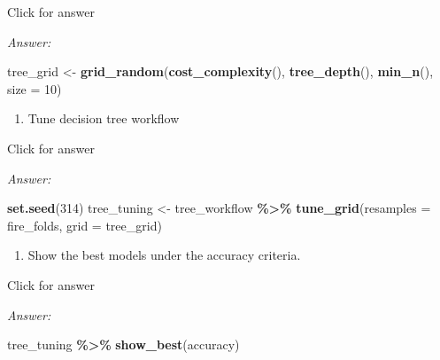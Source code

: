 \documentclass[
]{book}
\newenvironment{Shaded}{\begin{snugshade}}{\end{snugshade}}
\newcommand{\AttributeTok}[1]{\textcolor[rgb]{0.13,0.29,0.53}{#1}}
\newcommand{\DecValTok}[1]{\textcolor[rgb]{0.00,0.00,0.81}{#1}}
\newcommand{\FunctionTok}[1]{\textcolor[rgb]{0.13,0.29,0.53}{\textbf{#1}}}
\newcommand{\NormalTok}[1]{#1}
\newcommand{\OtherTok}[1]{\textcolor[rgb]{0.56,0.35,0.01}{#1}}
\newcommand{\SpecialCharTok}[1]{\textcolor[rgb]{0.81,0.36,0.00}{\textbf{#1}}}
\newcommand{\StringTok}[1]{\textcolor[rgb]{0.31,0.60,0.02}{#1}}
\providecommand{\tightlist}{%
  \setlength{\itemsep}{0pt}\setlength{\parskip}{0pt}}
\begin{document}
Click for answer

\emph{Answer:}

\begin{Shaded}
\begin{Highlighting}[]
\NormalTok{tree\_grid }\OtherTok{\textless{}{-}} \FunctionTok{grid\_random}\NormalTok{(}\FunctionTok{cost\_complexity}\NormalTok{(),}
                          \FunctionTok{tree\_depth}\NormalTok{(),}
                          \FunctionTok{min\_n}\NormalTok{(), }
                          \AttributeTok{size =} \DecValTok{10}\NormalTok{)}
\end{Highlighting}
\end{Shaded}

\begin{enumerate}
\def\labelenumi{\alph{enumi}.}
\setcounter{enumi}{4}
\tightlist
\item
  Tune decision tree workflow
\end{enumerate}

Click for answer

\emph{Answer:}

\begin{Shaded}
\begin{Highlighting}[]
\FunctionTok{set.seed}\NormalTok{(}\DecValTok{314}\NormalTok{)}
\NormalTok{tree\_tuning }\OtherTok{\textless{}{-}}\NormalTok{ tree\_workflow }\SpecialCharTok{\%\textgreater{}\%} 
               \FunctionTok{tune\_grid}\NormalTok{(}\AttributeTok{resamples =}\NormalTok{ fire\_folds,}
                         \AttributeTok{grid =}\NormalTok{ tree\_grid)}
\end{Highlighting}
\end{Shaded}

\begin{enumerate}
\def\labelenumi{\alph{enumi}.}
\setcounter{enumi}{5}
\tightlist
\item
  Show the best models under the accuracy criteria.
\end{enumerate}

Click for answer

\emph{Answer:}

\begin{Shaded}
\begin{Highlighting}[]
\NormalTok{tree\_tuning }\SpecialCharTok{\%\textgreater{}\%} \FunctionTok{show\_best}\NormalTok{(}\StringTok{\textquotesingle{}accuracy\textquotesingle{}}\NormalTok{)}
\end{Highlighting}
\end{Shaded}
\end{document}
